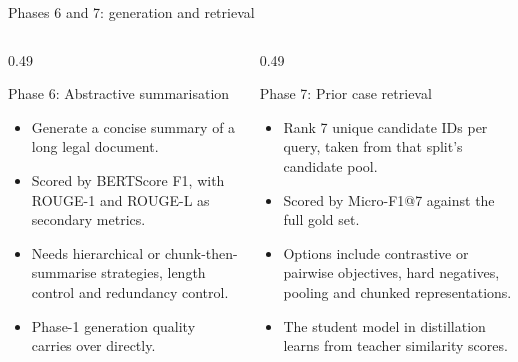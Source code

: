 \documentclass[aspectratio=169,11pt]{beamer}
\begin{document}
\begin{frame}{Phases 6 and 7: generation and retrieval}
  \begin{columns}[T]
    \begin{column}{0.49\textwidth}
      \begin{block}{Phase 6: Abstractive summarisation}
        \small
        \begin{itemize}
          \item Generate a concise summary of a long legal document.
          \item Scored by BERTScore F1, with ROUGE-1 and ROUGE-L as secondary metrics.
          \item Needs hierarchical or chunk-then-summarise strategies, length control and redundancy control.
          \item Phase-1 generation quality carries over directly.
        \end{itemize}
      \end{block}
    \end{column}
    \begin{column}{0.49\textwidth}
      \begin{block}{Phase 7: Prior case retrieval}
        \small
        \begin{itemize}
          \item Rank 7 unique candidate IDs per query, taken from that split's candidate pool.
          \item Scored by Micro-F1@7 against the full gold set.
          \item Options include contrastive or pairwise objectives, hard negatives, pooling and chunked representations.
          \item The student model in distillation learns from teacher similarity scores.
        \end{itemize}
      \end{block}
    \end{column}
  \end{columns}
\end{frame}
\end{document}
